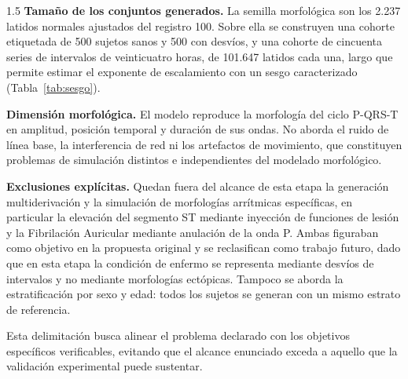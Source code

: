\begin{spacing}{1.5}
\textbf{Tamaño de los conjuntos generados.} La semilla morfológica son los 2.237 latidos normales ajustados del registro 100. Sobre ella se construyen una cohorte etiquetada de 500 sujetos sanos y 500 con desvíos, y una cohorte de cincuenta series de intervalos de veinticuatro horas, de 101.647 latidos cada una, largo que permite estimar el exponente de escalamiento con un sesgo caracterizado (Tabla~\ref{tab:sesgo}).

\textbf{Dimensión morfológica.} El modelo reproduce la morfología del ciclo P-QRS-T en amplitud, posición temporal y duración de sus ondas. No aborda el ruido de línea base, la interferencia de red ni los artefactos de movimiento, que constituyen problemas de simulación distintos e independientes del modelado morfológico.

\textbf{Exclusiones explícitas.} Quedan fuera del alcance de esta etapa la generación multiderivación y la simulación de morfologías arrítmicas específicas, en particular la elevación del segmento ST mediante inyección de funciones de lesión y la Fibrilación Auricular mediante anulación de la onda P. Ambas figuraban como objetivo en la propuesta original y se reclasifican como trabajo futuro, dado que en esta etapa la condición de enfermo se representa mediante desvíos de intervalos y no mediante morfologías ectópicas. Tampoco se aborda la estratificación por sexo y edad: todos los sujetos se generan con un mismo estrato de referencia.

Esta delimitación busca alinear el problema declarado con los objetivos específicos verificables, evitando que el alcance enunciado exceda a aquello que la validación experimental puede sustentar.

\end{spacing} 
